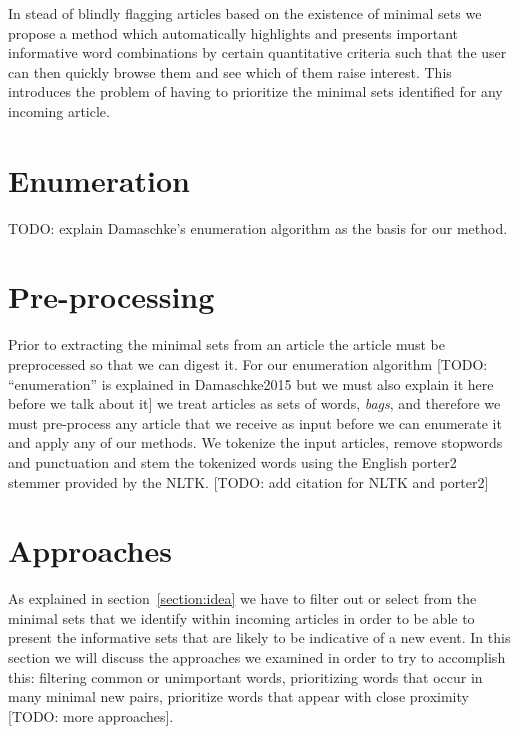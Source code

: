 In stead of blindly flagging articles based on the existence of minimal sets we propose a method which automatically highlights and presents important informative word combinations by certain quantitative criteria such that the user can then quickly browse them and see which of them raise interest. This introduces the problem of having to prioritize the minimal sets identified for any incoming article.

\section{Enumeration}
TODO: explain Damaschke's enumeration algorithm as the basis for our method.

\section{Pre-processing}
Prior to extracting the minimal sets from an article the article must be preprocessed so that we can digest it. For our enumeration algorithm [TODO: ``enumeration'' is explained in Damaschke2015 but we must also explain it here before we talk about it] we treat articles as sets of words, \emph{bags}, and therefore we must pre-process any article that we receive as input before we can enumerate it and apply any of our methods. We tokenize the input articles, remove stopwords and punctuation and stem the tokenized words using the English porter2 stemmer provided by the NLTK. [TODO: add citation for NLTK and porter2]

\section{Approaches}
As explained in section~\ref{section:idea} we have to filter out or select from the minimal sets that we identify within incoming articles in order to be able to present the informative sets that are likely to be indicative of a new event. In this section we will discuss the approaches we examined in order to try to accomplish this: filtering common or unimportant words, prioritizing words that occur in many minimal new pairs, prioritize words that appear with close proximity [TODO: more approaches].

